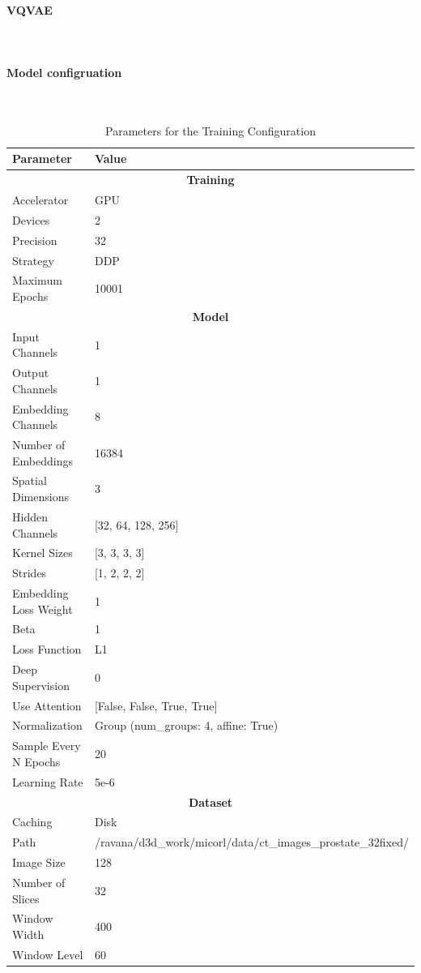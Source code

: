 
\paragraph{VQVAE}\mbox{}\\
\paragraph{Model configruation}\mbox{}\\

\begin{table}[h!]
\centering
\begin{tabular}{|l|l|}
\hline
\textbf{Parameter} & \textbf{Value} \\
\hline
\multicolumn{2}{|c|}{\textbf{Training}} \\
\hline
Accelerator & GPU \\
\hline
Devices & 2 \\
\hline
Precision & 32 \\
\hline
Strategy & DDP \\
\hline
Maximum Epochs & 10001 \\
\hline
\multicolumn{2}{|c|}{\textbf{Model}} \\
\hline
Input Channels & 1 \\
\hline
Output Channels & 1 \\
\hline
Embedding Channels & 8 \\
\hline
Number of Embeddings & 16384 \\
\hline
Spatial Dimensions & 3 \\
\hline
Hidden Channels & [32, 64, 128, 256] \\
\hline
Kernel Sizes & [3, 3, 3, 3] \\
\hline
Strides & [1, 2, 2, 2] \\
\hline
Embedding Loss Weight & 1 \\
\hline
Beta & 1 \\
\hline
Loss Function & L1 \\
\hline
Deep Supervision & 0 \\
\hline
Use Attention & [False, False, True, True] \\
\hline
Normalization & Group (num\_groups: 4, affine: True) \\
\hline
Sample Every N Epochs & 20 \\
\hline
Learning Rate & 5e-6 \\
\hline
\multicolumn{2}{|c|}{\textbf{Dataset}} \\
\hline
Caching & Disk \\
\hline
Path & /ravana/d3d\_work/micorl/data/ct\_images\_prostate\_32fixed/ \\
\hline
Image Size & 128 \\
\hline
Number of Slices & 32 \\
\hline
Window Width & 400 \\
\hline
Window Level & 60 \\
\hline
\end{tabular}
\caption{Parameters for the Training Configuration}
\label{table:training_params}
\end{table}

